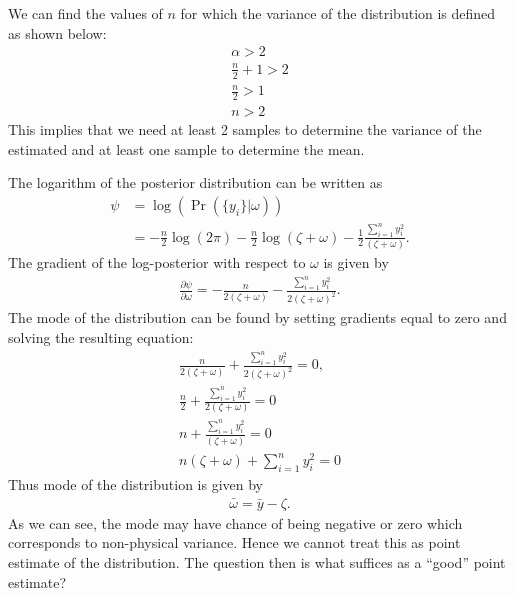\documentclass[11pt,twoside,a4paper]{article}
\begin{document}
  We can find the values of $n$ for which the variance of the distribution is
  defined as shown below:
  \begin{align}
    \alpha > 2 \\
    \frac{n}{2} + 1 > 2 \\
    \frac{n}{2} > 1 \\
    \boxed{n > 2}
  \end{align}
  This implies that we need at least 2 samples to determine the variance of the
  estimated and at least one sample to determine the mean.

  The logarithm of the posterior distribution can be written as
  \begin{align}
    \psi &= \log \left(\Pr \left(\{y_i\} | \omega \right) \right) \\
    &= -\frac{n}{2}\log(2 \pi) - \frac{n}{2}\log(\zeta + \omega)
      -\frac{1}{2} \frac{\sum_{i=1}^n y_i^2}{(\zeta + \omega)}.
  \end{align}
  The gradient of the log-posterior with respect to $\omega$ is given by
  \begin{align}
    \frac{\partial \psi}{\partial \omega} = -\frac{n}{2 (\zeta + \omega)}
      - \frac{\sum_{i=1}^n y_i^2}{2 (\zeta + \omega)^2}.
  \end{align}
  The mode of the distribution can be found by setting gradients equal to zero
  and solving the resulting equation:
  \begin{align}
    \frac{n}{2 (\zeta + \omega)}
      + \frac{\sum_{i=1}^n y_i^2}{2 (\zeta + \omega)^2} = 0, \\
    \frac{n}{2} + \frac{\sum_{i=1}^n y_i^2}{2 (\zeta + \omega)} = 0 \\
    n + \frac{\sum_{i=1}^n y_i^2}{(\zeta + \omega)} = 0 \\
    n (\zeta + \omega) + \sum_{i=1}^n y_i^2 = 0
  \end{align}
  Thus mode of the distribution is given by
  \begin{align}
    \boxed{\bar{\omega} = \bar{y} - \zeta.}
  \end{align}
  As we can see, the mode may have chance of being negative or zero which
  corresponds to non-physical variance. Hence we cannot treat this as point
  estimate of the distribution. The question then is what suffices as a
  ``good'' point estimate?
\end{document}
